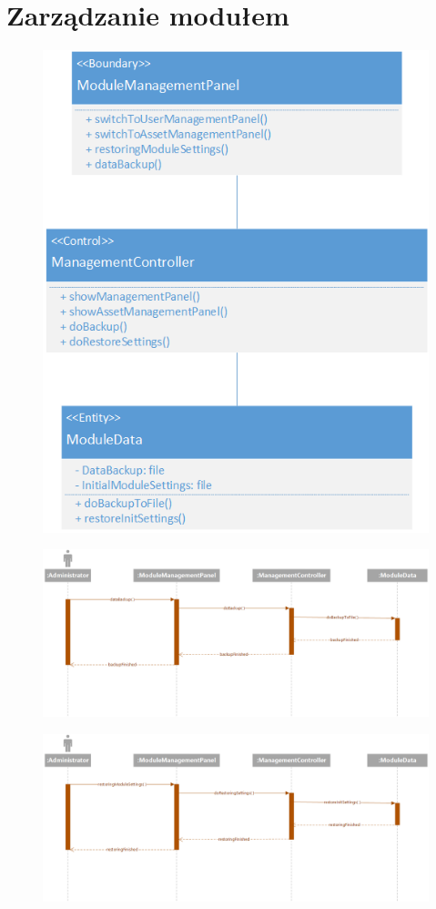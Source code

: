 \documentclass[11pt, a4paper, oneside]{report}
\begin{document}
\section{Zarządzanie modułem}
\begin{figure}[H]
\centering
\includegraphics[scale=0.5]{zarzadzanie_modulem_class.png}
\end{figure}
\begin{figure}[H]
\centering
\includegraphics[scale=0.5]{backup.png}
\end{figure}
\begin{figure}[H]
\centering
\includegraphics[scale=0.5]{restoring.png}
\end{figure}
\end{document}
